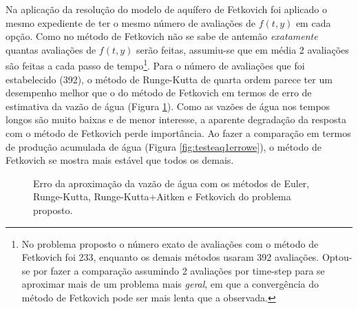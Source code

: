 \documentclass[final,5p]{elsarticle}
\numberwithin{equation}{section}
\begin{document}
        Na aplicação da resolução do modelo de aquífero de Fetkovich foi aplicado o mesmo expediente de ter o mesmo número de avaliações de $f(t,y)$ em cada opção. Como no método de Fetkovich não se sabe de antemão \emph{exatamente} quantas avaliações de $f(t,y)$ serão feitas, assumiu-se que em média 2 avaliações são feitas a cada passo de tempo\footnote{No problema proposto o número exato de avaliações com o método de Fetkovich foi 233, enquanto os demais métodos usaram 392 avaliações. Optou-se por fazer a comparação assumindo 2 avaliações por time-step para se aproximar mais de um problema mais \emph{geral}, em que a convergência do método de Fetkovich pode ser mais lenta que a observada.}. Para o número de avaliações que foi estabelecido (392), o método de Runge-Kutta de quarta ordem parece ter um desempenho melhor que o do método de Fetkovich em termos de erro de estimativa da vazão de água (Figura \ref{fig:testeaq1erroqw}). Como as vazões de água nos tempos longos são muito baixas e de menor interesse, a aparente degradação da resposta com o método de Fetkovich perde importância. Ao fazer a comparação em termos de produção acumulada de água (Figura \ref{fig:testeaq1errowe}), o método de Fetkovich se mostra mais estável que todos os demais.

        \begin{figure}[hbt!]
            \caption{Erro da aproximação da vazão de água com os métodos de Euler, Runge-Kutta, Runge-Kutta+Aitken e Fetkovich do problema proposto.}
            \label{fig:testeaq1erroqw}
        \end{figure}
\end{document}
